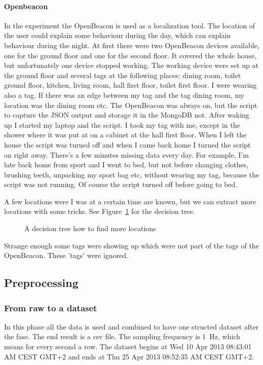 		\paragraph{Openbeacon}
			In the experiment the OpenBeacon is used as a localization tool. The location of the user could explain some behaviour during the day, which can explain behaviour during the night. At first there were two OpenBeacon devices available, one for the ground floor and one for the second floor. It covered the whole house, but unfortunately one device stopped working. The working device were set up at the ground floor and several tags at the following places: dining room, toilet ground floor, kitchen, living room, hall first floor, toilet first floor. I were wearing also a tag. If there was an edge between my tag and the tag dining room, my location was the dining room etc. The OpenBeacon was always on, but the script to capture the JSON output and storage it in the MongoDB not. After waking up I started my laptop and the script. I took my tag with me, except in the shower where it was put at on a cabinet at the hall first floor. When I left the house the script was turned off and when I came back home I turned the script on right away. There's a few minutes missing data every day. For example, I'm late back home from sport and I went to bed, but not before changing clothes, brushing teeth, unpacking my sport bag etc, without wearing my tag, because the script was not running. Of course the script turned off before going to bed.

			
			A few locations were I was at a certain time are known, but we can extract more locations with some tricks. See Figure~\ref{fig:decisiontree} for the decision tree.

				\begin{figure}[h!]
					
					\caption{A decision tree how to find more locations}
					\label{fig:decisiontree}
				\end{figure}

				Strange enough some tags were showing up which were not part of the tags of the OpenBeacon. These 'tags' were ignored.
				
	\subsection{Preprocessing}
		\subsubsection{From raw to a dataset}
			In this phase all the data is used and combined to have one structed dataset after the fase. The end result is a csv file. The sampling frequency is \SI{1}{\hertz}, which means for every second a row. The dataset begins at Wed 10 Apr 2013 08:43:01 AM CEST GMT+2 and ends at Thu 25 Apr 2013 08:52:35 AM CEST GMT+2. 
			
